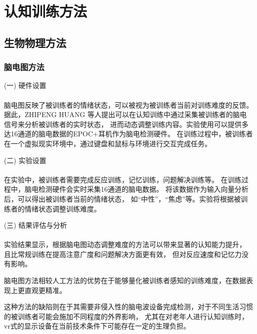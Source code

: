 \documentclass{article}
\begin{document}
            \section{认知训练方法}
        \subsection{生物物理方法}
            \subsubsection{脑电图方法}
            (一) 硬件设置\paragraph{}
            脑电图反映了被训练者的情绪状态，可以被视为被训练者当前对训练难度的反馈。
            据此，ZHIPENG HUANG \cite{ref1}等人提出可以在认知训练中通过采集被训练者的脑电信号来分析被训练者的实时状态，
            进而动态调整训练内容。实验使用可以提供多达16通道的脑电数据的EPOC+耳机作为脑电检测硬件。
            在训练过程中，被训练者在一个虚拟现实环境中，通过键盘和鼠标与环境进行交互完成任务。

            (二) 实验设置\paragraph{}
            在实验中，被训练者需要完成反应训练，记忆训练，问题解决训练等。
            在训练过程中，脑电检测硬件会实时采集16通道的脑电数据。
            将该数据作为输入向量分析后，可以得出被训练者当前的情绪状态，
            如“中性”，“焦虑”等。实验将根据被训练者的情绪状态调整训练难度。

            (三) 结果评估与分析\paragraph{}
            实验结果显示，根据脑电图动态调整难度的方法可以带来显著的认知能力提升，
            且比常规训练在提高注意广度和问题解决方面更有效，
            但对反应速度和记忆力没有影响。

            脑电图方法相较人工方法的优势在于能够量化被训练者感知的训练难度，在数据表现上更直观更精准。

            这种方法的缺陷则在于其需要非侵入性的脑电波设备完成检测，对于不同生活习惯的被训练者可能会施加不同程度的外界影响，
            尤其在对老年人进行认知训练时，vr式的显示设备在当前技术条件下可能存在一定的生理负担。
\end{document}
